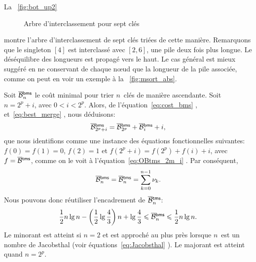 La \fig~\vref{fig:bot_up2}
\begin{figure}[!b]
\centering
{}
\qquad
{}
\caption{Arbre d'interclassement pour sept clés}
\end{figure}
montre l'arbre d'interclassement
de sept clés triées de cette manière. Remarquons que le singleton
\([4]\) est interclassé avec \([2,6]\), une pile deux fois plus
longue. Le déséquilibre des longueurs est propagé vers le haut. Le cas
général est mieux suggéré en ne conservant de chaque nœud que la
longueur de la pile associée, comme on peut en voir un exemple à la
\fig~\vref{fig:msort_abs}.


Soit \(\OB{\fun{bms}}{n}\) le coût
minimal pour trier \(n\)~clés de manière ascendante. Soit \(n=2^p+i\),
avec \(0 < i < 2^p\). Alors, de l'équation~\eqref{eq:cost_bms}
, et~\eqref{eq:best_merge}
, nous déduisons:
\begin{equation*}
\OB{\fun{bms}}{2^p+i} = \OB{\fun{bms}}{2^p} + \OB{\fun{bms}}{i} + i,
\end{equation*}
que nous identifions comme une instance des équations fonctionnelles
suivantes: \(f(0)=f(1)=0\), \(f(2)=1\) et \(f(2^p+i) = f(2^p) + f(i) +
i\), avec \(f=\OB{\fun{tms}}{}\), comme on le voit à
l'équation~\eqref{eq:OBtms_2m_i} . Par
conséquent,
\begin{equation}
\OB{\fun{bms}}{n} = \OB{\fun{tms}}{n} = \sum_{k=0}^{n-1}{\nu_k}.
\label{eq:OBbms}
\end{equation}
Nous pouvons donc réutiliser l'encadrement de \(\OB{\fun{tms}}{n}\):
\begin{equation}
\frac{1}{2}n\lg n - \left(\frac{1}{2}\lg\frac{4}{3}\right)n + \lg\frac{4}{3}
\leqslant \OB{\fun{bms}}{n} \leqslant
\frac{1}{2}n\lg n.
\index{bms@$\OB{\fun{bms}}{n}$}
\end{equation}
Le minorant est atteint si \(n=2\) et est approché au plus près
lorsque \(n\)~est un nombre de Jacobsthal (voir équations~\eqref{eq:Jacobsthal}
). Le majorant est atteint quand \(n=2^p\).


